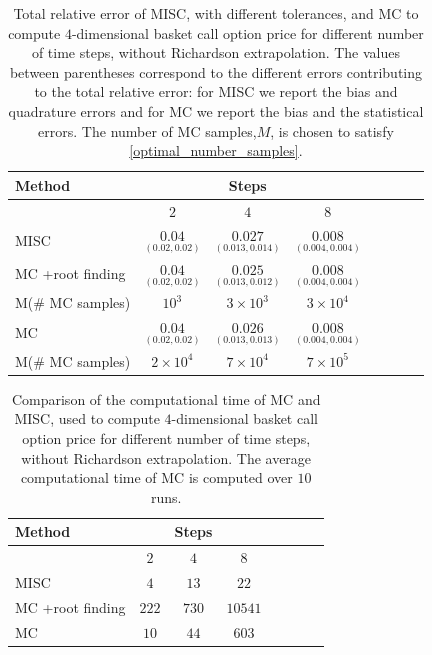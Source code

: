 \FloatBarrier
\begin{table}[h!]
	\centering
	\begin{tabular}{l*{6}{c}r}
		\toprule[1.5pt]
	Method & & Steps  & &     \\
	\hline
           & $2$ & $4$ & $8$   \\
		\hline
		MISC   &  $\underset{(0.02,0.02)}{\mathbf{0.04}}$ & $\underset{(0.013,0.014)}{\mathbf{0.027}}$ & $\underset{(0.004,0.004)}{\mathbf{0.008}}$   \\

		\hline		
			MC +root finding   &  $\underset{(0.02,0.02)}{\mathbf{0.04}}$ & $\underset{(0.013,0.012)}{\mathbf{0.025}}$ & $\underset{(0.004,0.004)}{\mathbf{0.008}}$  \\
			M(\# MC samples)   & $10^3$   &  $3 \times 10^3$ &  $3 \times 10^4$  \\	
		\hline	
				MC   &  $\underset{(0.02,0.02)}{\mathbf{0.04}}$ & $\underset{(0.013,0.013)}{\mathbf{0.026}}$ & $\underset{(0.004,0.004)}{\mathbf{0.008}}$   \\	
				M(\# MC samples)   &$2 \times 10^4$  & $7 \times 10^4 $  &  $7 \times 10^5 $ \\	
		
			\bottomrule[1.25pt]
	\end{tabular}
	\caption{Total relative  error of MISC, with different tolerances, and MC to compute $4$-dimensional basket call option price for different number of time steps, without Richardson extrapolation. The values between parentheses correspond to the different errors contributing to the total relative error: for MISC we report the bias and quadrature errors and for MC we report the bias and the statistical errors. The number of MC samples,$ M$, is chosen to satisfy \eqref{optimal_number_samples}.}
	\label{Total error of MISC and MC to compute 4 dim basket  Call option price of the different tolerances for different number of time steps, without Richardson extrapolation. The numbers between parentheses are the corresponding absolute errors.}
\end{table}
\FloatBarrier




\begin{table}[h!]
	\centering
	\begin{tabular}{l*{6}{c}r}
		\toprule[1.5pt]
	Method & & Steps  & &     \\
	\hline
	         & $2$ & $4$ & $8$    \\
		\hline
		MISC & $4$  & $13$ & $22$     \\
			MC  +root finding  & $222$&  $730$&  $10541$   \\
				MC  &   $10$& $44$ &   $603$ \\
		\bottomrule[1.25pt]
	\end{tabular}
	\caption{Comparison of the computational time of  MC and MISC, used to compute $4$-dimensional basket call option price  for different number of time steps, without Richardson extrapolation. The average computational time of MC is computed over $10$ runs.}
	\label{Comparsion of the computational time of  MC and MISC, used to compute 4 dim basket Call option price  for different number of time steps, without Richardson extrapolation}
\end{table}


